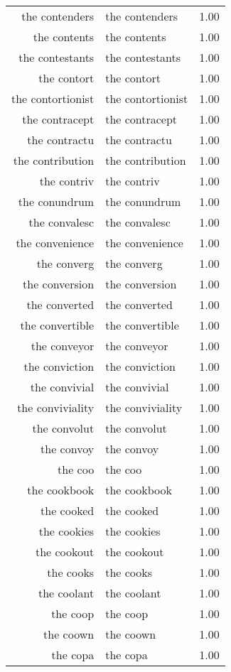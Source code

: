 \begin{table}[ht]
\begin{tabular}{rlr}
  the contenders & the contenders & 1.00 \\ 
  the contents & the contents & 1.00 \\ 
  the contestants & the contestants & 1.00 \\ 
  the contort & the contort & 1.00 \\ 
  the contortionist & the contortionist & 1.00 \\ 
  the contracept & the contracept & 1.00 \\ 
  the contractu & the contractu & 1.00 \\ 
  the contribution & the contribution & 1.00 \\ 
  the contriv & the contriv & 1.00 \\ 
  the conundrum & the conundrum & 1.00 \\ 
  the convalesc & the convalesc & 1.00 \\ 
  the convenience & the convenience & 1.00 \\ 
  the converg & the converg & 1.00 \\ 
  the conversion & the conversion & 1.00 \\ 
  the converted & the converted & 1.00 \\ 
  the convertible & the convertible & 1.00 \\ 
  the conveyor & the conveyor & 1.00 \\ 
  the conviction & the conviction & 1.00 \\ 
  the convivial & the convivial & 1.00 \\ 
  the conviviality & the conviviality & 1.00 \\ 
  the convolut & the convolut & 1.00 \\ 
  the convoy & the convoy & 1.00 \\ 
  the coo & the coo & 1.00 \\ 
  the cookbook & the cookbook & 1.00 \\ 
  the cooked & the cooked & 1.00 \\ 
  the cookies & the cookies & 1.00 \\ 
  the cookout & the cookout & 1.00 \\ 
  the cooks & the cooks & 1.00 \\ 
  the coolant & the coolant & 1.00 \\ 
  the coop & the coop & 1.00 \\ 
  the coown & the coown & 1.00 \\ 
  the copa & the copa & 1.00 \\ 

\end{tabular}
\end{table}
